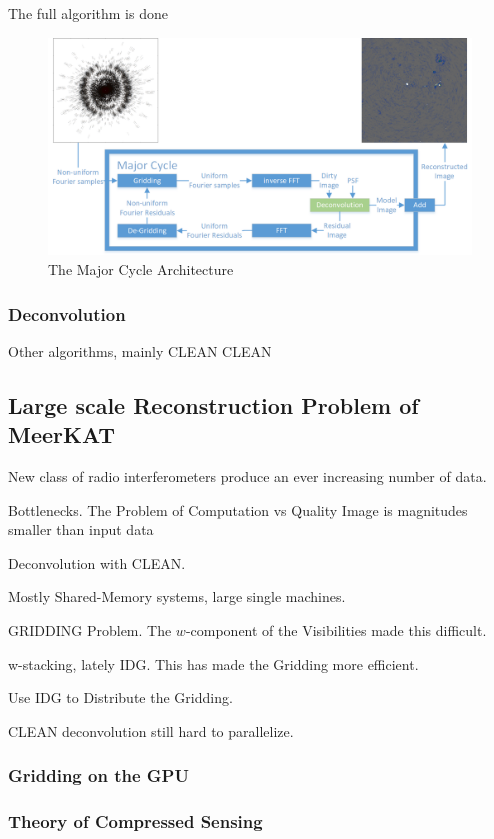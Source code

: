 The full algorithm is done 

\begin{figure}[h]
	\centering
	\includegraphics[width=0.80\linewidth]{./chapters/02.hypo/Major-Minor3.png}
	\caption{The Major Cycle Architecture}
	\label{intro:major}
\end{figure}

\subsubsection{ Deconvolution}
Other algorithms, mainly CLEAN
CLEAN




\subsection{Large scale Reconstruction Problem of MeerKAT}
New class of radio interferometers produce an ever increasing number of data.


Bottlenecks.
The Problem of Computation vs Quality
Image is magnitudes smaller than input data

Deconvolution with CLEAN.

Mostly Shared-Memory systems, large single machines.

GRIDDING Problem. The $w$-component of the Visibilities made this difficult. 

w-stacking, lately IDG. This has made the Gridding more efficient.

Use IDG to Distribute the Gridding.




CLEAN deconvolution still hard to parallelize.


\subsubsection{Gridding on the GPU}

\subsubsection{Theory of Compressed Sensing}











